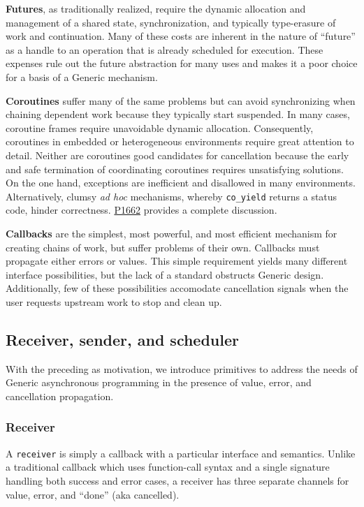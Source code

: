 \documentclass[a4paper,12pt,notitlepage,twoside,openright]{article}
\begin{document}
\textbf{Futures}, as traditionally realized, require the dynamic
allocation and management of a shared state, synchronization, and
typically type-erasure of work and continuation. Many of these costs are
inherent in the nature of ``future'' as a handle to an operation that is
already scheduled for execution. These expenses rule out the future
abstraction for many uses and makes it a poor choice for a basis of a
Generic mechanism.

\textbf{Coroutines} suffer many of the same problems but can avoid
synchronizing when chaining dependent work because they typically start
suspended. In many cases, coroutine frames require unavoidable dynamic
allocation. Consequently, coroutines in embedded or heterogeneous
environments require great attention to detail. Neither are coroutines
good candidates for cancellation because the early and safe termination
of coordinating coroutines requires unsatisfying solutions. On the one
hand, exceptions are inefficient and disallowed in many environments.
Alternatively, clumsy \emph{ad hoc} mechanisms, whereby
\texttt{co_yield} returns a status code, hinder correctness.
\href{http://wg21.link/P1662}{P1662} provides a complete discussion.

\textbf{Callbacks} are the simplest, most powerful, and most efficient
mechanism for creating chains of work, but suffer problems of their own.
Callbacks must propagate either errors or values. This simple
requirement yields many different interface possibilities, but the lack
of a standard obstructs Generic design. Additionally, few of these
possibilities accomodate cancellation signals when the user requests
upstream work to stop and clean up.

\hypertarget{receiver-sender-and-scheduler}{%
\subsection{Receiver, sender, and
scheduler}\label{receiver-sender-and-scheduler}}

With the preceding as motivation, we introduce primitives to address the
needs of Generic asynchronous programming in the presence of value,
error, and cancellation propagation.

\hypertarget{receiver}{%
\subsubsection{Receiver}\label{receiver}}

A \texttt{receiver} is simply a callback with a particular
interface and semantics. Unlike a traditional callback which uses
function-call syntax and a single signature handling both success and
error cases, a receiver has three separate channels for value, error,
and ``done'' (aka cancelled).
\end{document}
